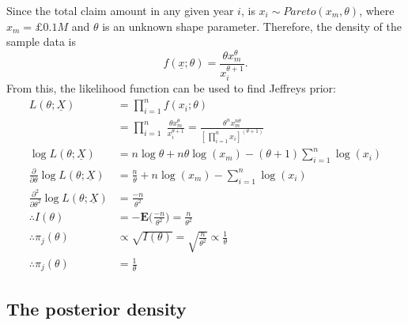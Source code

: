 \documentclass[11pt,a4paper]{article}
\newcommand{\E}{\textbf{E}}
\renewcommand{\th}{\theta}
\begin{document}
Since the total claim amount in any given year $i$, is $x_i \sim Pareto(x_m,\theta)$, where $x_m = £0.1M$ and $\theta$ is an unknown shape parameter. Therefore, the density of the sample data is $$ f(\underline x; \theta) = \frac{\theta x_m^\theta}{x_i^{\theta+1}}. $$ From this, the likelihood function can be used to find Jeffreys prior:
\begin{align*}
    L(\theta; \underline{X}) &= \prod_{i=1}^n f(x_i;\theta)\\
                             &= \prod_{i=1}^n \; \frac{\theta x_m^\theta}{x_i^{\theta+1}} = \frac{\theta^n x_m^{n\theta}}{[\, \prod_{i=1}^n x_i]^{(\theta+1)}} \\
    \log L(\th;\underline X) &= n\log\th + n\th\log(x_m) - (\th + 1)\sum_{i=1}^n\log(x_i) \\
    \frac{\partial}{\partial\th}\log L(\th;\underline X) &= \frac{n}{\th} + n\log(x_m) - \sum_{i=1}^n\log(x_i) \\
    \frac{\partial^2}{\partial\th^2}\log L(\th;\underline X) &= \frac{-n}{\th^2} \\
    \therefore I(\th) &= -\E \bigg( \frac{-n}{\th^2} \bigg) = \frac{n}{\th^2} \\
    \therefore \pi_j(\th) &\propto \sqrt{I(\th)} = \sqrt{ \frac{n}{\th^2} } \propto \frac{1}{\th} \\
    \therefore \pi_j(\th) &= \frac{1}{\th}
\end{align*}

\subsection{The posterior density}
\end{document}
